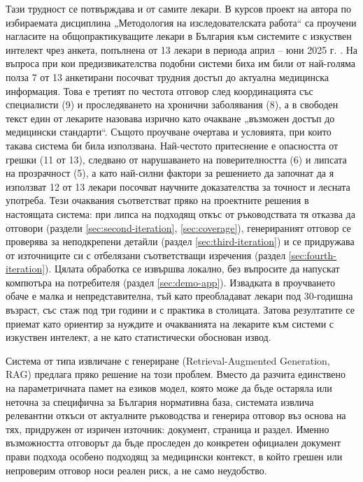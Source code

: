 \documentclass[12pt,a4paper]{article}
\begin{document}
Тази трудност се потвърждава и от самите лекари. В курсов проект на автора по избираемата дисциплина „Методология на изследователската работа“ са проучени нагласите на общопрактикуващите лекари в България към системите с изкуствен интелект чрез анкета, попълнена от 13 лекари в периода април -- юни 2025 г. \cite{pashovska2025gpsurvey}. На въпроса при кои предизвикателства подобни системи биха им били от най-голяма полза 7 от 13 анкетирани посочват трудния достъп до актуална медицинска информация. Това е третият по честота отговор след координацията със специалисти (9) и проследяването на хронични заболявания (8), а в свободен текст един от лекарите назовава изрично като очакване „възможен достъп до медицински стандарти“. Същото проучване очертава и условията, при които такава система би била използвана. Най-честото притеснение е опасността от грешки (11 от 13), следвано от нарушаването на поверителността (6) и липсата на прозрачност (5), а като най-силни фактори за решението да започнат да я използват 12 от 13 лекари посочват научните доказателства за точност и лесната употреба. Тези очаквания съответстват пряко на проектните решения в настоящата система: при липса на подходящ откъс от ръководствата тя отказва да отговори (раздели \ref{sec:second-iteration}, \ref{sec:coverage}), генерираният отговор се проверява за неподкрепени детайли (раздел \ref{sec:third-iteration}) и се придружава от източниците си с отбелязани съответстващи изречения (раздел \ref{sec:fourth-iteration}). Цялата обработка се извършва локално, без въпросите да напускат компютъра на потребителя (раздел \ref{sec:demo-app}). Извадката в проучването обаче е малка и непредставителна, тъй като преобладават лекари под 30-годишна възраст, със стаж под три години и с практика в столицата. Затова резултатите се приемат като ориентир за нуждите и очакванията на лекарите към системи с изкуствен интелект, а не като статистически обоснован извод.

Система от типа извличане с генериране (Retrieval-Augmented Generation, RAG) предлага пряко решение на този проблем. Вместо да разчита единствено на параметричната памет на езиков модел, която може да бъде остаряла или неточна за специфична за България нормативна база, системата извлича релевантни откъси от актуалните ръководства и генерира отговор въз основа на тях, придружен от изричен източник: документ, страница и раздел. Именно възможността отговорът да бъде проследен до конкретен официален документ прави подхода особено подходящ за медицински контекст, в който грешен или непроверим отговор носи реален риск, а не само неудобство.
\end{document}
